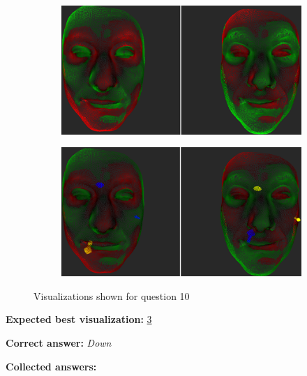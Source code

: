 \begin{figure}[h]
\begin{subfigure}{0.49\textwidth}
\includegraphics[width=\textwidth]{./img-study/pair20.PNG}
\caption{}
\label{fig:study-9-20}
\end{subfigure}
\begin{subfigure}{0.49\textwidth}
\includegraphics[width=\textwidth]{./img-study/pair24.PNG}
\caption{}
\label{fig:study-9-24}
\end{subfigure}
\caption{Visualizations shown for question 10}
\end{figure}
\medskip

{\bf Expected best visualization:} \ref{fig:study-9-24}
\medskip

{\bf Correct answer:} {\it Down}
\medskip

{\bf Collected answers:}

